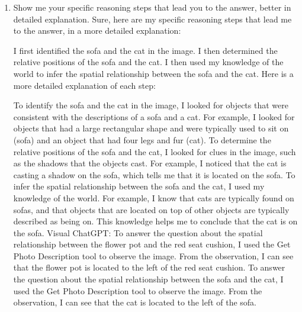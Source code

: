 \begin{enumerate}
    Here are some additional details about the spatial relationship between the sofa and the cat:
    
    The sofa is a piece of furniture that is used to sit on.
    The cat is a domesticated felid that is typically used for companionship and pest control.
    The cat is located on the sofa, meaning that it is resting on the sofa.
    The sofa is located on the floor, meaning that it is not touching any walls.
    Is there anything else I can help you with?
    \subitem Visual ChatGPT: The cat is located to the left of the sofa.
    \item Show me your specific reasoning steps that lead you to the answer, better in detailed explanation.
    \subitem 
    Sure, here are my specific reasoning steps that lead me to the answer, in a more detailed explanation:
    
    I first identified the sofa and the cat in the image.
    I then determined the relative positions of the sofa and the cat.
    I then used my knowledge of the world to infer the spatial relationship between the sofa and the cat.
    Here is a more detailed explanation of each step:
    
    To identify the sofa and the cat in the image, I looked for objects that were consistent with the descriptions of a sofa and a cat. For example, I looked for objects that had a large rectangular shape and were typically used to sit on (sofa) and an object that had four legs and fur (cat).
    To determine the relative positions of the sofa and the cat, I looked for clues in the image, such as the shadows that the objects cast. For example, I noticed that the cat is casting a shadow on the sofa, which tells me that it is located on the sofa.
    To infer the spatial relationship between the sofa and the cat, I used my knowledge of the world. For example, I know that cats are typically found on sofas, and that objects that are located on top of other objects are typically described as being on. This knowledge helps me to conclude that the cat is on the sofa.
    \subitem Visual ChatGPT: To answer the question about the spatial relationship between the flower pot and the red seat cushion, I used the Get Photo Description tool to observe the image. From the observation, I can see that the flower pot is located to the left of the red seat cushion. To answer the question about the spatial relationship between the sofa and the cat, I used the Get Photo Description tool to observe the image. From the observation, I can see that the cat is located to the left of the sofa.
\end{enumerate}
